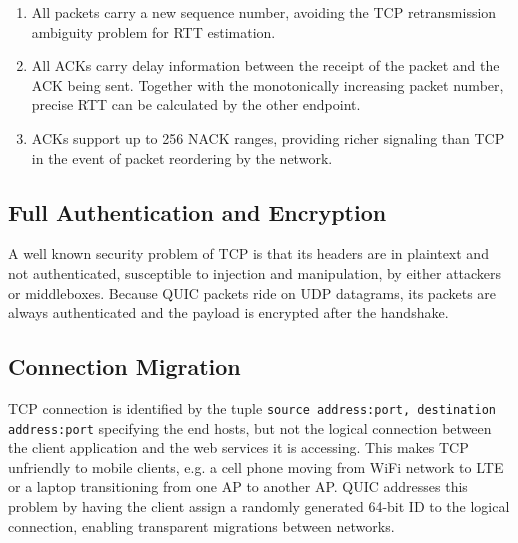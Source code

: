 \documentclass{sig-alternate-05-2015}
\begin{document}
\begin{enumerate}
	\itemsep0em
	\item All packets carry a new sequence number, avoiding the TCP retransmission ambiguity problem for RTT estimation.
	\item All ACKs carry delay information between the receipt of the packet and the ACK being sent. Together with the monotonically increasing packet number, precise RTT can be calculated by the other endpoint.
	\item ACKs support up to 256 NACK ranges, providing richer signaling than TCP in the event of packet reordering by the network.
\end{enumerate}

\subsection{Full Authentication and Encryption}
A well known security problem of TCP is that its headers are in plaintext and not authenticated, susceptible to injection and manipulation, by either attackers or middleboxes. Because QUIC packets ride on UDP datagrams, its packets are always authenticated and the payload is encrypted after the handshake. \cite{quic:draft}

\subsection{Connection Migration}
TCP connection is identified by the tuple \texttt{source address:port, destination address:port} specifying the end hosts, but not the logical connection between the client application and the web services it is accessing.  This makes TCP unfriendly to mobile clients, e.g. a cell phone moving from WiFi network to LTE or a laptop transitioning from one AP to another AP. QUIC addresses this problem by having the client assign a randomly generated 64-bit ID to the logical connection, enabling transparent migrations between networks. \cite{quic:draft}
\end{document}
